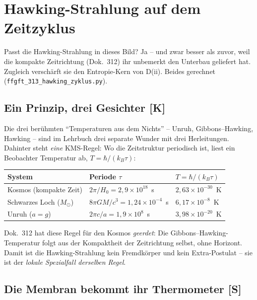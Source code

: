 \chapter{Hawking-Strahlung auf dem Zeitzyklus}

Passt die Hawking-Strahlung in dieses Bild? Ja -- und zwar besser
als zuvor, weil die kompakte Zeitrichtung (Dok.~312) ihr unbemerkt
den Unterbau geliefert hat. Zugleich verschärft sie den
Entropie-Kern von D(ii). Beides gerechnet
(\texttt{ffgft\_313\_hawking\_zyklus.py}).

\section{Ein Prinzip, drei Gesichter [K]}

Die drei berühmten \enquote{Temperaturen aus dem Nichts} --
Unruh, Gibbons--Hawking, Hawking -- sind im Lehrbuch drei separate
Wunder mit drei Herleitungen. Dahinter steht \emph{eine}
KMS-Regel: Wo die Zeitstruktur periodisch ist, liest ein
Beobachter Temperatur ab, $T = \hbar/(k_B\tau)$:

\begin{center}
\begin{tabular}{lll}
\toprule
System & Periode $\tau$ & $T = \hbar/(k_B\tau)$ \\
\midrule
Kosmos (kompakte Zeit) & $2\pi/H_0 = 2{,}9\times10^{18}$~s &
  $2{,}63\times10^{-30}$~K \\
Schwarzes Loch ($M_\odot$) & $8\pi GM/c^3 = 1{,}24\times10^{-4}$~s &
  $6{,}17\times10^{-8}$~K \\
Unruh ($a = g$) & $2\pi c/a = 1{,}9\times10^{8}$~s &
  $3{,}98\times10^{-20}$~K \\
\bottomrule
\end{tabular}
\end{center}

Dok.~312 hat diese Regel für den Kosmos \emph{geerdet}: Die
Gibbons--Hawking-Temperatur folgt aus der Kompaktheit der
Zeitrichtung selbst, ohne Horizont. Damit ist die
Hawking-Strahlung kein Fremdkörper und kein Extra-Postulat -- sie
ist der \emph{lokale Spezialfall derselben Regel}.

\section{Die Membran bekommt ihr Thermometer [S]}

